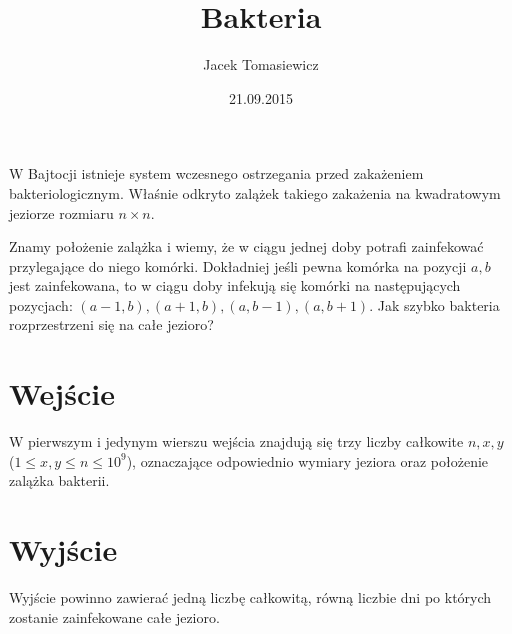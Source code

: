 \documentclass[zad,zawodnik,utf8]{sinol}
\title{Bakteria}
\author{Jacek Tomasiewicz}
\date{21.09.2015}
\begin{document}
  \begin{tasktext}%
W Bajtocji istnieje system wczesnego ostrzegania przed zakażeniem bakteriologicznym.
Właśnie odkryto zalążek takiego zakażenia na kwadratowym jeziorze rozmiaru $n \times n$.

Znamy położenie zalążka i wiemy, że w ciągu jednej doby potrafi zainfekować przylegające do niego komórki. 
Dokładniej jeśli pewna komórka na pozycji $a, b$ jest zainfekowana, to w ciągu doby infekują się komórki na następujących pozycjach: $(a-1, b),(a+1,b),(a, b-1), (a, b+1)$.
Jak szybko bakteria rozprzestrzeni się na całe jezioro?

  \section{Wejście}
W pierwszym i jedynym wierszu wejścia znajdują się trzy liczby całkowite $n, x, y$ ($1 \leq x, y \leq n \leq 10^9$), 
oznaczające odpowiednio wymiary jeziora oraz położenie zalążka bakterii.

  \section{Wyjście}
Wyjście powinno zawierać jedną liczbę całkowitą, równą liczbie dni po których zostanie zainfekowane całe jezioro.

     \makecompactexample


  \end{tasktext}
\end{document}
